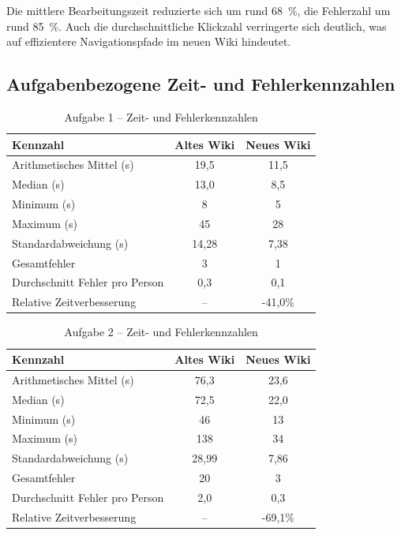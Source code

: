 Die mittlere Bearbeitungszeit reduzierte sich um rund 68~\%, die Fehlerzahl um rund 85~\%. Auch die durchschnittliche Klickzahl verringerte sich deutlich, was auf effizientere Navigationspfade im neuen Wiki hindeutet.

\subsection{Aufgabenbezogene Zeit- und Fehlerkennzahlen}

\begin{table}[H]
\centering
\caption{Aufgabe 1 -- Zeit- und Fehlerkennzahlen}
\label{tab:BB-task1-stats}
\begin{tabular}{l c c}
\toprule
Kennzahl & Altes Wiki & Neues Wiki \\
\midrule
Arithmetisches Mittel (s) & 19,5 & 11,5 \\
Median (s) & 13,0 & 8,5 \\
Minimum (s) & 8 & 5 \\
Maximum (s) & 45 & 28 \\
Standardabweichung (s) & 14,28 & 7,38 \\
Gesamtfehler & 3 & 1 \\
Durchschnitt Fehler pro Person & 0,3 & 0,1 \\
Relative Zeitverbesserung & -- & -41,0\% \\
\bottomrule
\end{tabular}
\end{table}

\begin{table}[H]
\centering
\caption{Aufgabe 2 -- Zeit- und Fehlerkennzahlen}
\label{tab:BB-task2-stats}
\begin{tabular}{l c c}
\toprule
Kennzahl & Altes Wiki & Neues Wiki \\
\midrule
Arithmetisches Mittel (s) & 76,3 & 23,6 \\
Median (s) & 72,5 & 22,0 \\
Minimum (s) & 46 & 13 \\
Maximum (s) & 138 & 34 \\
Standardabweichung (s) & 28,99 & 7,86 \\
Gesamtfehler & 20 & 3 \\
Durchschnitt Fehler pro Person & 2,0 & 0,3 \\
Relative Zeitverbesserung & -- & -69,1\% \\
\bottomrule
\end{tabular}
\end{table}

